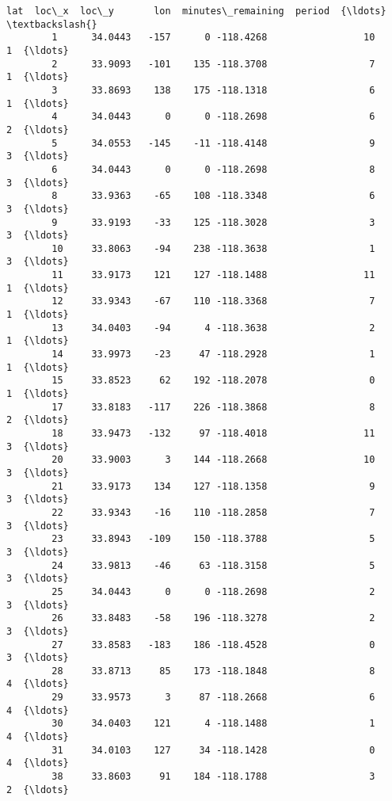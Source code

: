 \documentclass[11pt]{article}
\begin{document}
\begin{Verbatim}[commandchars=\\\{\}]
                   lat  loc\_x  loc\_y       lon  minutes\_remaining  period  {\ldots}    \textbackslash{}
        1      34.0443   -157      0 -118.4268                 10       1  {\ldots}     
        2      33.9093   -101    135 -118.3708                  7       1  {\ldots}     
        3      33.8693    138    175 -118.1318                  6       1  {\ldots}     
        4      34.0443      0      0 -118.2698                  6       2  {\ldots}     
        5      34.0553   -145    -11 -118.4148                  9       3  {\ldots}     
        6      34.0443      0      0 -118.2698                  8       3  {\ldots}     
        8      33.9363    -65    108 -118.3348                  6       3  {\ldots}     
        9      33.9193    -33    125 -118.3028                  3       3  {\ldots}     
        10     33.8063    -94    238 -118.3638                  1       3  {\ldots}     
        11     33.9173    121    127 -118.1488                 11       1  {\ldots}     
        12     33.9343    -67    110 -118.3368                  7       1  {\ldots}     
        13     34.0403    -94      4 -118.3638                  2       1  {\ldots}     
        14     33.9973    -23     47 -118.2928                  1       1  {\ldots}     
        15     33.8523     62    192 -118.2078                  0       1  {\ldots}     
        17     33.8183   -117    226 -118.3868                  8       2  {\ldots}     
        18     33.9473   -132     97 -118.4018                 11       3  {\ldots}     
        20     33.9003      3    144 -118.2668                 10       3  {\ldots}     
        21     33.9173    134    127 -118.1358                  9       3  {\ldots}     
        22     33.9343    -16    110 -118.2858                  7       3  {\ldots}     
        23     33.8943   -109    150 -118.3788                  5       3  {\ldots}     
        24     33.9813    -46     63 -118.3158                  5       3  {\ldots}     
        25     34.0443      0      0 -118.2698                  2       3  {\ldots}     
        26     33.8483    -58    196 -118.3278                  2       3  {\ldots}     
        27     33.8583   -183    186 -118.4528                  0       3  {\ldots}     
        28     33.8713     85    173 -118.1848                  8       4  {\ldots}     
        29     33.9573      3     87 -118.2668                  6       4  {\ldots}     
        30     34.0403    121      4 -118.1488                  1       4  {\ldots}     
        31     34.0103    127     34 -118.1428                  0       4  {\ldots}     
        38     33.8603     91    184 -118.1788                  3       2  {\ldots}     

\end{Verbatim}
\end{document}
